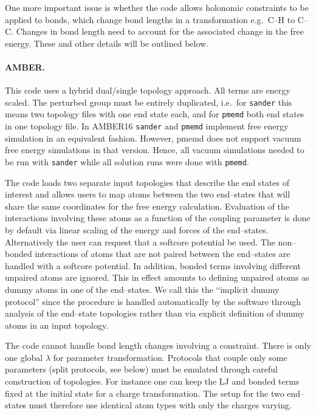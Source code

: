 \documentclass[journal=jctcce,manuscript=article]{achemso}
\newcommand{\progname}[1]{\texttt{#1}}
\begin{document}
One more important issue is whether the code allows holonomic constraints to be applied
to bonds, which change bond lengths in a transformation e.g.\ C--H to C--C.
Changes in bond length need to account for the associated change in the free
energy.  These and other details will be outlined below.

\paragraph{AMBER.}  This code uses a hybrid dual/single topology
approach.  All terms are energy scaled. The perturbed group must be
entirely duplicated, i.e.\ for \progname{sander} this means two
topology files with one end state each, and for \progname{pmemd} both
end states in one topology file.  In AMBER16 \progname{sander} and
\progname{pmemd} implement free energy simulation in an equivalent
fashion.  However, pmemd does not support vacuum free energy simulations
in that version.  Hence, all vacuum simulations needed to be run with
\progname{sander} while all solution runs were done with
\progname{pmemd}.

The code loads two separate input topologies that describe the end
states of interest and allows users to map atoms between the two
end--states that will share the same coordinates for the free energy
calculation.  Evaluation of the interactions involving these atoms as
a function of the coupling parameter is done by default via linear
scaling of the energy and forces of the end--states.  Alternatively
the user can request that a softcore potential be used.  The
non--bonded interactions of atoms that are not paired between the
end--states are handled with a softcore potential.  In addition,
bonded terms involving different unpaired atoms are ignored.  This in
effect amounts to defining unpaired atoms as dummy atoms in one of the
end--states.  We call this the ``implicit dummy protocol'' since the
procedure is handled automatically by the software through analysis of
the end--state topologies rather than via explicit definition of dummy
atoms in an input topology.

The code cannot handle bond length changes involving a constraint.
There is only one global $\lambda$ for parameter transformation.
Protocols that couple only some parameters (split protocols, see
below) must be emulated through careful construction of topologies.  For instance one can keep the LJ and bonded terms fixed at the initial state for a charge transformation.  The setup for
the two end--states must therefore use identical atom types with only the charges varying.
\end{document}
